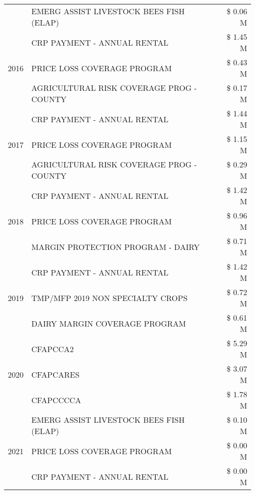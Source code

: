 \begin{tabular}{llr}
 & EMERG ASSIST LIVESTOCK BEES FISH (ELAP) & \$ 0.06 M \\
\cline{1-3}
\multirow[t]{3}{*}{2016} & CRP PAYMENT - ANNUAL RENTAL                   & \$ 1.45 M \\
 & PRICE LOSS COVERAGE PROGRAM                   & \$ 0.43 M \\
 & AGRICULTURAL RISK COVERAGE PROG - COUNTY      & \$ 0.17 M \\
\cline{1-3}
\multirow[t]{3}{*}{2017} & CRP PAYMENT - ANNUAL RENTAL & \$ 1.44 M \\
 & PRICE LOSS COVERAGE PROGRAM & \$ 1.15 M \\
 & AGRICULTURAL RISK COVERAGE PROG - COUNTY & \$ 0.29 M \\
\cline{1-3}
\multirow[t]{3}{*}{2018} & CRP PAYMENT - ANNUAL RENTAL & \$ 1.42 M \\
 & PRICE LOSS COVERAGE PROGRAM & \$ 0.96 M \\
 & MARGIN PROTECTION PROGRAM - DAIRY & \$ 0.71 M \\
\cline{1-3}
\multirow[t]{3}{*}{2019} & CRP PAYMENT - ANNUAL RENTAL & \$ 1.42 M \\
 & TMP/MFP 2019 NON SPECIALTY CROPS & \$ 0.72 M \\
 & DAIRY MARGIN COVERAGE PROGRAM & \$ 0.61 M \\
\cline{1-3}
\multirow[t]{3}{*}{2020} & CFAPCCA2 & \$ 5.29 M \\
 & CFAPCARES & \$ 3.07 M \\
 & CFAPCCCCA & \$ 1.78 M \\
\cline{1-3}
\multirow[t]{3}{*}{2021} & EMERG ASSIST LIVESTOCK BEES FISH (ELAP) & \$ 0.10 M \\
 & PRICE LOSS COVERAGE PROGRAM & \$ 0.00 M \\
 & CRP PAYMENT - ANNUAL RENTAL & \$ 0.00 M \\
\cline{1-3}
\bottomrule
\end{tabular}
